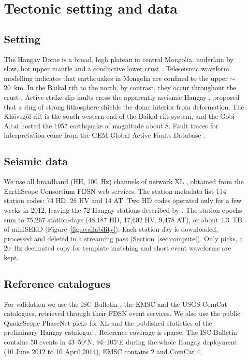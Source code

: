 \documentclass[11pt]{article}
\begin{document}
\section{Tectonic setting and data}
\label{sec:data}

\subsection{Setting}
The Hangay Dome is a broad, high plateau in central Mongolia, underlain by slow, hot upper mantle \citep{feng2021} and a conductive lower crust \citep{comeau2018}. Teleseismic waveform modelling indicates that earthquakes in Mongolia are confined to the upper $\sim$20~km. In the Baikal rift to the north, by contrast, they occur throughout the crust \citep{bayasgalan2005,deverchere2001}. Active strike-slip faults cross the apparently aseismic Hangay \citep{walker2008}. \citet{huang2022} proposed that a ring of strong lithosphere shields the dome interior from deformation. The Khövsgöl rift is the south-western end of the Baikal rift system, and the Gobi-Altai hosted the 1957 earthquake of magnitude about 8. Fault traces for interpretation come from the GEM Global Active Faults Database \citep{styron2020}.

\subsection{Seismic data}
We use all broadband (HH, 100~Hz) channels of network XL \citep{xl_dataset}, obtained from the EarthScope Consortium FDSN web services. The station metadata list 114 station codes: 74 HD, 26 HV and 14 AT. Two HD codes operated only for a few weeks in 2012, leaving the 72 Hangay stations described by \citet{meltzer2019}. The station epochs sum to 75,267 station-days (48,187 HD, 17,602 HV, 9,478 AT), or about 1.3~TB of miniSEED (Figure~\ref{fig:availability}). Each station-day is downloaded, processed and deleted in a streaming pass (Section~\ref{sec:compute}). Only picks, a 20~Hz decimated copy for template matching and short event waveforms are kept.

\subsection{Reference catalogues}
For validation we use the ISC Bulletin \citep{isc_bulletin,storchak2017}, the EMSC and the USGS ComCat catalogues, retrieved through their FDSN event services. We also use the public QuakeScope PhaseNet picks for XL \citep{ni2025} and the published statistics of the preliminary Hangay catalogue \citep{meltzer2019}. Reference coverage is sparse. The ISC Bulletin contains 50 events in 43--50$^\circ$N, 94--105$^\circ$E during the whole Hangay deployment (10 June 2012 to 10 April 2014), EMSC contains 2 and ComCat 4.
\end{document}
